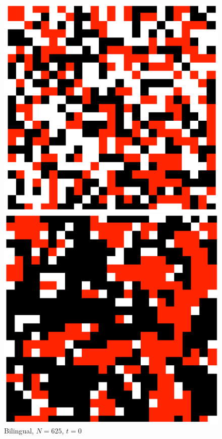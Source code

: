 \begin{figure}[h]
\centering
\begin{minipage}[t]{0.43\linewidth}
    \centering
    \includegraphics[width=\textwidth]{images/task29/regular_net_bi_t=1.png} 
    \caption{\scriptsize Bilingual, \(N=625\), \(t=0\)}
    \label{reg_net_bi1}
\end{minipage}
\hfill
\begin{minipage}[t]{0.43\linewidth}
    \centering
    \includegraphics[width=\textwidth]{images/task29/regular_net_bi_t=5000.png} 

\end{minipage}
\end{figure}

